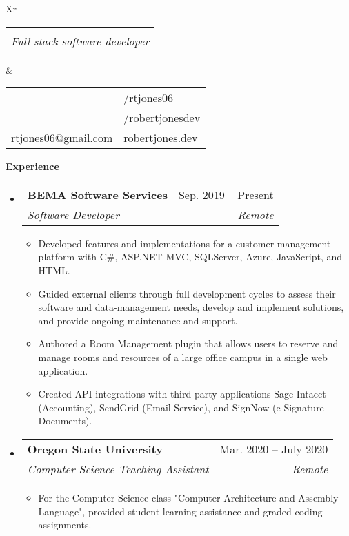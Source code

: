 \documentclass[letterpaper,12pt]{article}[leftmargin=*]
\makeatletter
\def \fullname {Robert Jones}
\def \subtitle {Full-stack software developer}
\def \locationicon {\faGlobe}
\def \locationtext {Salt Lake City, Utah}
\def \linkedinicon {\faLinkedin}
\def \linkedinlink {https://linkedin.com/in/rtjones06/}
\def \linkedintext {/rtjones06}
\def \phoneicon {\faPhone}
\def \phonetext {(713) 408-4485}
\def \emailicon {\faEnvelope}
\def \emaillink {mailto:rtjones06@gmail.com}
\def \emailtext {rtjones06@gmail.com}
\def \githubicon {\faGithub}
\def \githublink {https://github.com/robertjonesdev}
\def \githubtext {/robertjonesdev}
\def \websiteicon {\faGlobe}
\def \websitelink {https://robertjones.dev/}
\def \websitetext {robertjones.dev}
\def \headertype {\doublecol} %
\def \entryspacing {-0pt}
\def \linkedin {\linkedinicon \hspace{3pt}\href{\linkedinlink}{\linkedintext}}
\def \phone {\phoneicon \hspace{3pt}{ \phonetext}}
\def \location {\locationicon \hspace{3pt}{ \locationtext }}
\def \email {\emailicon \hspace{3pt}\href{\emaillink}{\emailtext}}
\def \github {\githubicon \hspace{3pt}\href{\githublink}{\githubtext}}
\def \website {\websiteicon \hspace{3pt}\href{\websitelink}{\websitetext}}
\renewcommand{\section}[2]{\vspace{5pt}
  \colorbox{secondary}{\color{white}\raggedbottom\normalsize\textbf{{#1}{\hspace{7pt}#2}}}
}
\newcommand{\resumeEntryStart}{\begin{itemize}[leftmargin=2.5mm]}
\newcommand{\resumeEntryEnd}{\end{itemize}\vspace{\entryspacing}}
\newcommand{\resumeItemListStart}{\begin{itemize}[leftmargin=4.5mm]}
\newcommand{\resumeItemListEnd}{\end{itemize}}
\newcommand{\resumeItem}[1]{
  \item\small{
    {#1 \vspace{-2pt}}
  }
}
\newcommand{\resumeEntryTSDL}[4]{
  \vspace{-1pt}\item[]
    \begin{tabularx}{0.97\textwidth}{X@{\hspace{60pt}}r}
      \textbf{\color{primary}#1} & {\firabook\color{accent}\small#2} \\
      \textit{\color{accent}\small#3} & \textit{\color{accent}\small#4} \\
    \end{tabularx}\vspace{-6pt}
}
\newcommand{\resumeEntryS}[2]{
  \item[]\small{
    \textbf{\color{primary}#1 }{ #2 \vspace{-6pt}}
  }
}
\newcommand{\doublecol}[6]{
  \begin{tabularx}{\textwidth}{Xr}
    {
      \begin{tabular}[c]{l}
        \fontsize{35}{45}\selectfont{\color{primary}{{\textbf{\fullname}}}} \\
        {\textit{\subtitle}} %
      \end{tabular}
    } & {
      \begin{tabular}[c]{l@{\hspace{1.5em}}l}
        {\small#4} & {\small#1} \\
        {\small#5} & {\small#2} \\
        {\small#6} & {\small#3}
      \end{tabular}
    }
  \end{tabularx}
}
\newcommand{\singlecol}[6]{
  \begin{tabularx}{\textwidth}{Xr}
    {
      \begin{tabular}[b]{l}
        \fontsize{35}{45}\selectfont{\color{primary}{{\textbf{\fullname}}}} \\
        {\textit{\subtitle}} %
      \end{tabular}
    } & {
      \begin{tabular}[c]{l}
        {\small#1} \\
        {\small#2} \\
        {\small#3} \\
        {\small#4} \\
        {\small#5} \\
        {\small#6}
      \end{tabular}
    }
  \end{tabularx}
}
\makeatother
\begin{document}


\headertype{\linkedin}{\github}{\website}{\location}{\phone}{\email}{} %
\vspace{0pt} %


\section{\faPieChart}{Experience}

  \resumeEntryStart
    \resumeEntryTSDL
      {BEMA Software Services}{Sep. 2019 -- Present}
      {Software Developer}{Remote}
    \resumeItemListStart
      \resumeItem {Developed features and implementations for a customer-management platform with C\#, ASP.NET MVC, SQLServer, Azure, JavaScript, and HTML. }
      \resumeItem {Guided external clients through full development cycles to assess their software and data-management needs, develop and implement solutions, and provide ongoing maintenance and support.}
      \resumeItem {Authored a Room Management plugin that allows users to reserve and manage rooms and resources of a large office campus in a single web application.}
      \resumeItem {Created API integrations with third-party applications Sage Intacct (Accounting), SendGrid (Email Service), and SignNow (e-Signature Documents).}
    \resumeItemListEnd
  \resumeEntryEnd

  \resumeEntryStart
    \resumeEntryTSDL
      {Oregon State University}{Mar. 2020 -- July 2020}
      {Computer Science Teaching Assistant}{Remote}
    \resumeItemListStart
      \resumeItem {For the Computer Science class "Computer Architecture and Assembly Language", provided student learning assistance and graded coding assignments.}
    \resumeItemListEnd
  \resumeEntryEnd
\end{document}
